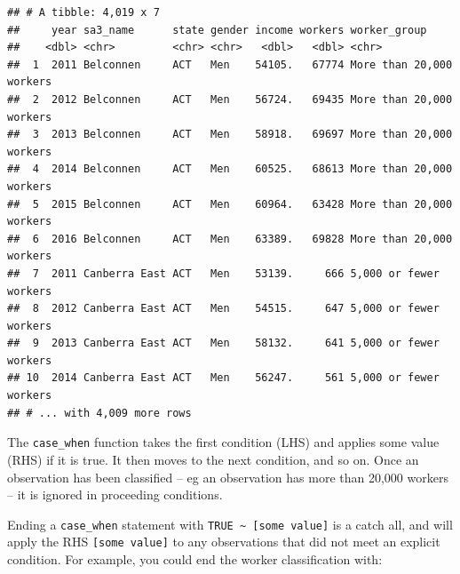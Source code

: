 \documentclass[]{book}
\newenvironment{Shaded}{\begin{snugshade}}{\end{snugshade}}
\newcommand{\DataTypeTok}[1]{\textcolor[rgb]{0.13,0.29,0.53}{#1}}
\newcommand{\DecValTok}[1]{\textcolor[rgb]{0.00,0.00,0.81}{#1}}
\newcommand{\KeywordTok}[1]{\textcolor[rgb]{0.13,0.29,0.53}{\textbf{#1}}}
\newcommand{\NormalTok}[1]{#1}
\newcommand{\OperatorTok}[1]{\textcolor[rgb]{0.81,0.36,0.00}{\textbf{#1}}}
\newcommand{\OtherTok}[1]{\textcolor[rgb]{0.56,0.35,0.01}{#1}}
\newcommand{\StringTok}[1]{\textcolor[rgb]{0.31,0.60,0.02}{#1}}
\begin{document}
\begin{verbatim}
## # A tibble: 4,019 x 7
##     year sa3_name      state gender income workers worker_group            
##    <dbl> <chr>         <chr> <chr>   <dbl>   <dbl> <chr>                   
##  1  2011 Belconnen     ACT   Men    54105.   67774 More than 20,000 workers
##  2  2012 Belconnen     ACT   Men    56724.   69435 More than 20,000 workers
##  3  2013 Belconnen     ACT   Men    58918.   69697 More than 20,000 workers
##  4  2014 Belconnen     ACT   Men    60525.   68613 More than 20,000 workers
##  5  2015 Belconnen     ACT   Men    60964.   63428 More than 20,000 workers
##  6  2016 Belconnen     ACT   Men    63389.   69828 More than 20,000 workers
##  7  2011 Canberra East ACT   Men    53139.     666 5,000 or fewer workers  
##  8  2012 Canberra East ACT   Men    54515.     647 5,000 or fewer workers  
##  9  2013 Canberra East ACT   Men    58132.     641 5,000 or fewer workers  
## 10  2014 Canberra East ACT   Men    56247.     561 5,000 or fewer workers  
## # ... with 4,009 more rows
\end{verbatim}

The \texttt{case\_when} function takes the first condition (LHS) and applies some value (RHS) if it is true. It then moves to the next condition, and so on. Once an observation has been classified -- eg an observation has more than 20,000 workers -- it is ignored in proceeding conditions.

Ending a \texttt{case\_when} statement with \texttt{TRUE\ \textasciitilde{}\ {[}some\ value{]}} is a catch all, and will apply the RHS \texttt{{[}some\ value{]}} to any observations that did not meet an explicit condition. For example, you could end the worker classification with:

\begin{Shaded}
\end{Shaded}
\end{document}
